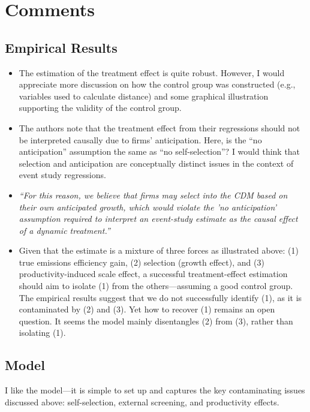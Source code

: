 \documentclass[12pt]{article}[margin=1in]
\begin{document}
\section{Comments}

\subsection{Empirical Results}

\begin{itemize}
    \item The estimation of the treatment effect is quite robust. However, I would appreciate more discussion on how the control group was constructed (e.g., variables used to calculate distance) and some graphical illustration supporting the validity of the control group.

    \item The authors note that the treatment effect from their regressions should not be interpreted causally due to firms' anticipation. Here, is the ``no anticipation'' assumption the same as ``no self-selection''? I would think that selection and anticipation are conceptually distinct issues in the context of event study regressions.

    \item[] \textit{``For this reason, we believe that firms may select into the CDM based on their own anticipated growth, which would violate the 'no anticipation' assumption required to interpret an event-study estimate as the causal effect of a dynamic treatment.''}

    \item Given that the estimate is a mixture of three forces as illustrated above: (1) true emissions efficiency gain, (2) selection (growth effect), and (3) productivity-induced scale effect, a successful treatment-effect estimation should aim to isolate (1) from the others—assuming a good control group. The empirical results suggest that we do not successfully identify (1), as it is contaminated by (2) and (3). Yet how to recover (1) remains an open question. It seems the model mainly disentangles (2) from (3), rather than isolating (1).
\end{itemize}

\subsection{Model}

I like the model—it is simple to set up and captures the key contaminating issues discussed above: self-selection, external screening, and productivity effects.
\end{document}
